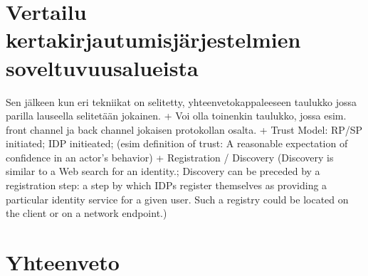 \documentclass[english,gradu]{tktltiki}
\begin{document}
\section{Vertailu kertakirjautumisjärjestelmien soveltuvuusalueista} %
\label{sec:kertakirjautumisjärjestelmien_}

  Sen jälkeen kun eri tekniikat on selitetty, yhteenvetokappaleeseen taulukko jossa parilla lauseella selitetään jokainen.
  + Voi olla toinenkin taulukko, jossa esim. front channel ja back channel jokaisen protokollan osalta.
  + Trust Model: RP/SP initiated; IDP initieated; (esim definition of trust: A reasonable expectation of confidence in an actor’s behavior)
  + Registration / Discovery (Discovery is similar to a Web search for an identity.; Discovery can be preceded by a registration step: a step by which IDPs register themselves as providing a particular identity service for a given user. Such a registry could be located on the client or on a network endpoint.)


\section{Yhteenveto} %
\label{sec:yhteenveto}





\lastpage
\end{document}
